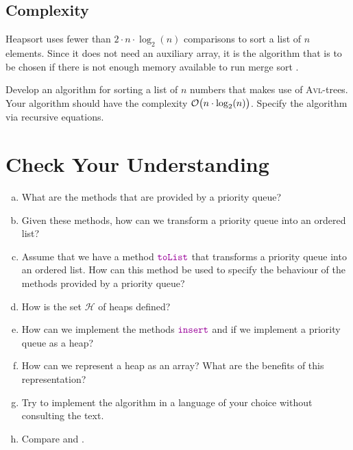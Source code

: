 \subsection{Complexity}
Heapsort uses fewer than $2 \cdot n \cdot \log_2(n)$ comparisons to sort a list of $n$ elements.  Since it does
not need an auxiliary array, it is the algorithm that is to be chosen if there is not enough memory available
to run merge sort \cite{sedgewick:11}.  

\exercise
Develop an algorithm for sorting a list of $n$ numbers that makes use of \textsc{Avl}-trees.  Your algorithm
should have the complexity $\mathcal{O}\bigl(n \cdot \log_2(n)\bigr)$.  Specify the algorithm via recursive equations.
\eox
\pagebreak

\section{Check Your Understanding}
\begin{enumerate}[(a)]
\item What are the methods that are provided by a priority queue?
\item Given these methods, how can we transform a priority queue into an ordered list?
\item Assume that we have a method $\mytt{toList}$ that transforms a priority queue into
      an ordered list.  How can this method be used to specify the behaviour of the methods
      provided by a priority queue?
\item How is the set $\mathcal{H}$ of heaps defined?
\item How can we implement the methods $\mytt{insert}$ and  if we implement a priority queue as a
      heap? 
\item How can we represent a heap as an array?  What are the benefits of this representation?
\item Try to implement the algorithm  in a language of your choice without consulting the text.
\item Compare  and . 
\end{enumerate}

